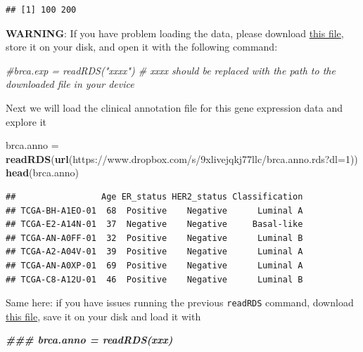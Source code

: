 \documentclass[
]{book}
\newenvironment{Shaded}{\begin{snugshade}}{\end{snugshade}}
\newcommand{\CommentTok}[1]{\textcolor[rgb]{0.56,0.35,0.01}{\textit{#1}}}
\newcommand{\DocumentationTok}[1]{\textcolor[rgb]{0.56,0.35,0.01}{\textbf{\textit{#1}}}}
\newcommand{\FunctionTok}[1]{\textcolor[rgb]{0.13,0.29,0.53}{\textbf{#1}}}
\newcommand{\NormalTok}[1]{#1}
\newcommand{\OtherTok}[1]{\textcolor[rgb]{0.56,0.35,0.01}{#1}}
\newcommand{\StringTok}[1]{\textcolor[rgb]{0.31,0.60,0.02}{#1}}
\begin{document}
\begin{verbatim}
## [1] 100 200
\end{verbatim}

\textbf{WARNING}: If you have problem loading the data, please download \href{https://www.dropbox.com/s/qububmfvtv443mq/brca.exp.rds?dl=1}{this file}, store it on your disk, and open it with the following command:

\begin{Shaded}
\begin{Highlighting}[]
\CommentTok{\#brca.exp = readRDS("xxxx") \# xxxx should be replaced with the path to the downloaded file in your device}
\end{Highlighting}
\end{Shaded}

Next we will load the clinical annotation file for this gene expression data and explore it

\begin{Shaded}
\begin{Highlighting}[]
\NormalTok{brca.anno }\OtherTok{=} \FunctionTok{readRDS}\NormalTok{(}\FunctionTok{url}\NormalTok{(}\StringTok{\textquotesingle{}https://www.dropbox.com/s/9xlivejqkj77llc/brca.anno.rds?dl=1\textquotesingle{}}\NormalTok{))}
\FunctionTok{head}\NormalTok{(brca.anno)}
\end{Highlighting}
\end{Shaded}

\begin{verbatim}
##                 Age ER_status HER2_status Classification
## TCGA-BH-A1EO-01  68  Positive    Negative      Luminal A
## TCGA-E2-A14N-01  37  Negative    Negative     Basal-like
## TCGA-AN-A0FF-01  32  Positive    Negative      Luminal B
## TCGA-A2-A04V-01  39  Positive    Negative      Luminal A
## TCGA-AN-A0XP-01  69  Positive    Negative      Luminal A
## TCGA-C8-A12U-01  46  Positive    Negative      Luminal B
\end{verbatim}

Same here: if you have issues running the previous \texttt{readRDS} command, download \href{https://www.dropbox.com/s/z6bzwzgzdhky1qz/brca.anno.rds?dl=1}{this file}, save it on your disk and load it with

\begin{Shaded}
\begin{Highlighting}[]
\DocumentationTok{\#\#\# brca.anno = readRDS(xxx)}
\end{Highlighting}
\end{Shaded}
\end{document}
